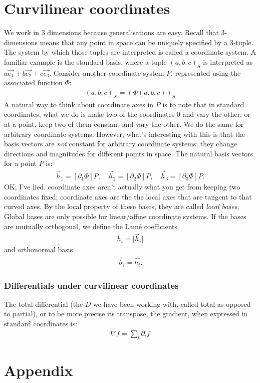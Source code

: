 \documentclass{article}
\theoremstyle{definition}
\begin{document}
\section{Curvilinear coordinates}
We work in 3 dimensions because generalisations are easy. Recall that 3-dimensions means that any point in space can be uniquely specified by a 3-tuple. The system by which those tuples are interpreted is called a coordinate system. A familiar example is the standard basis, where a tuple $(a,b,c)_S$ is interpreted as $a\vec{e_1}+b\vec{e_2}+c\vec{e_3}$. Consider another coordinate system $P$, represented using the associated function $\Phi$:
\begin{align*}
	(a,b,c)_X=(\Phi(a,b,c))_S
\end{align*}
A natural way to think about coordinate axes in $P$ is to note that in standard coordinates, what we do is make two of the coordinates 0 and vary the other; or at a point, keep two of them constant and vary the other. We do the same for arbitrary coordinate systems. However, what's interesting with this is that the basis vectors are \emph{not} constant for arbitrary coordinate systems; they change directions and magnitudes for different points in space. The natural basis vectors for a point $P$ is:
\begin{align*}
	\vec h_1=[\partial_1\Phi]P,\quad\vec h_2=[\partial_2\Phi]P,\quad\vec h_3=[\partial_3\Phi]P.
\end{align*}
OK, I've lied. coordinate axes aren't actually what you get from keeping two coordinates fixed; coordinate axes are the the local axes that are tangent to that curved axes.
By the local property of these bases, they are called \emph{local bases}. Global bases are only possible for linear/affine coordinate systems. If the bases are mutually orthogonal, we define the Lamé coefficients
\begin{align*}
	h_i=\lvert\vec h_i\rvert
\end{align*}
and orthonormal basis
\begin{align*}
	\vec b_i=\hat{h_i}.
\end{align*}
\subsubsection{Differentials under curvilinear coordinates}
The total differential (the $D$ we have been working with, called total as opposed to partial), or to be more precise its transpose, the gradient, when expressed in standard coordinates is:
\begin{align*}
	\nabla f=\sum_{i}\partial_if
\end{align*}

\newpage
\appendix
\section{Appendix}
\end{document}

